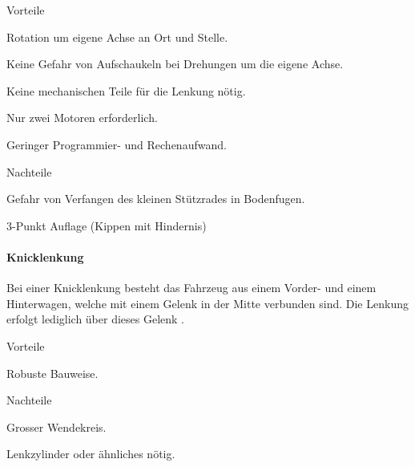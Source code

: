 \documentclass[../main.tex]{subfiles}
\begin{document}
\begin{minipage}[t]{0.48\textwidth}
    \begin{items}
        \item[Vorteile]
        \item Rotation um eigene Achse an Ort und Stelle.
        \item Keine Gefahr von Aufschaukeln bei Drehungen um die eigene Achse.
        \item Keine mechanischen Teile für die Lenkung nötig.
        \item Nur zwei Motoren erforderlich.
         \item Geringer Programmier- und Rechenaufwand.
    \end{items}
\end{minipage}
\begin{minipage}[t]{0.48\textwidth}
    \begin{items}
      \item [Nachteile]
      \item Gefahr von Verfangen des kleinen Stützrades in Bodenfugen.
      \item 3-Punkt Auflage (Kippen mit Hindernis)
    \end{items}
\end{minipage}

\paragraph{Knicklenkung} \label{recherche-knicklenkung}

Bei einer Knicklenkung besteht das Fahrzeug aus einem Vorder- und einem Hinterwagen, welche mit einem Gelenk in der Mitte verbunden sind. Die Lenkung erfolgt lediglich über dieses Gelenk \cite{knicklenkung}.

\begin{minipage}[t]{0.48\textwidth}
    \begin{items}
      \item [Vorteile]
      \item Robuste Bauweise.
 \end{items}
\end{minipage}
\hfill
\begin{minipage}[t]{0.48\textwidth}
    \begin{items}
      \item [Nachteile]
      \item Grosser Wendekreis.
      \item Lenkzylinder oder ähnliches nötig.
    \end{items}
\end{minipage}
\end{document}
